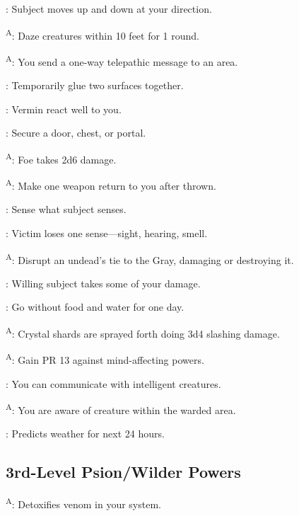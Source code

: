 : Subject moves up and down at your direction.

\textsuperscript{A}: Daze creatures within 10 feet for 1 round.

\textsuperscript{A}: You send a one-way telepathic message to an area.

: Temporarily glue two surfaces together.

: Vermin react well to you.

: Secure a door, chest, or portal.

\textsuperscript{A}: Foe takes 2d6 damage.

\textsuperscript{A}: Make one weapon return to you after thrown.

: Sense what subject senses.

: Victim loses one sense---sight, hearing, smell.

\textsuperscript{A}: Disrupt an undead’s tie to the Gray, damaging or destroying it.

: Willing subject takes some of your damage.

: Go without food and water for one day.

\textsuperscript{A}: Crystal shards are sprayed forth doing 3d4 slashing damage.

\textsuperscript{A}: Gain PR 13 against mind-affecting powers.

: You can communicate with intelligent creatures.

\textsuperscript{A}: You are aware of creature within the warded area.

: Predicts weather for next 24 hours.




\subsection{3rd-Level Psion/Wilder Powers}

\textsuperscript{A}: Detoxifies venom in your system.

